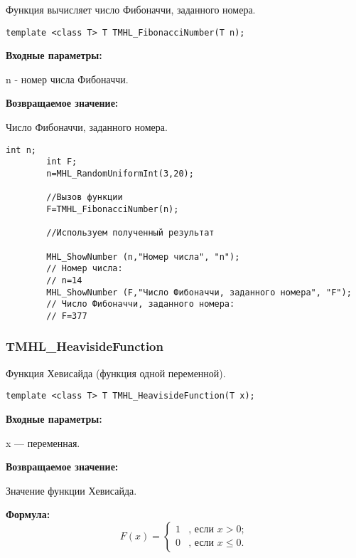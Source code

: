 \documentclass[a4paper,12pt]{article}
\begin{document}
Функция вычисляет число Фибоначчи, заданного номера.


\begin{lstlisting}[label=code_syntax_TMHL_FibonacciNumber,caption=Синтаксис]
template <class T> T TMHL_FibonacciNumber(T n);
\end{lstlisting}

\textbf{Входные параметры:}  
 
 n - номер числа Фибоначчи.

\textbf{Возвращаемое значение:}
 
 Число Фибоначчи, заданного номера.


\begin{lstlisting}[label=code_use_TMHL_FibonacciNumber,caption=Пример использования]
        int n;
        int F;
        n=MHL_RandomUniformInt(3,20);

        //Вызов функции
        F=TMHL_FibonacciNumber(n);

        //Используем полученный результат

        MHL_ShowNumber (n,"Номер числа", "n");
        // Номер числа:
        // n=14
        MHL_ShowNumber (F,"Число Фибоначчи, заданного номера", "F");
        // Число Фибоначчи, заданного номера:
        // F=377
\end{lstlisting}

\subsubsection{TMHL\_HeavisideFunction}\label{TMHL_HeavisideFunction}

Функция Хевисайда (функция одной переменной).


\begin{lstlisting}[label=code_syntax_TMHL_HeavisideFunction,caption=Синтаксис]
template <class T> T TMHL_HeavisideFunction(T x);
\end{lstlisting}

\textbf{Входные параметры:}

 x --- переменная.

\textbf{Возвращаемое значение:}
 
 Значение функции Хевисайда.
 
\textbf{Формула:}
\begin{equation*}
F\left(x \right)=\left\lbrace \begin{aligned}
1&\text{, если } x>0; \\
0&\text{, если } x\leq 0.
\end{aligned}\right. 
\end{equation*}
\end{document}
